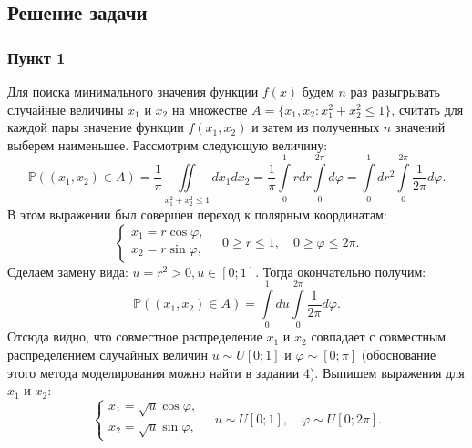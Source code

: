 \documentclass[oneside, final, 12pt]{article}
\begin{document}
\subsection{Решение задачи}
\subsubsection{Пункт 1}
	Для поиска минимального значения функции $f(x)$ будем $n$ раз разыгрывать случайные величины 
	$x_1$ и $x_2$ на множестве  $A = \{x_1, x_2: x_1^2+x_2^2\leqslant 1\}$, считать для каждой пары
	 значение функции $f(x_1, x_2)$ и затем из полученных $n$ значений выберем наименьшее.
	 \newline
	Рассмотрим следующую величину:
	$$
		\mathbb{P}((x_1,x_2) \in A) = \frac{1}{\pi} \iint\limits_{x_1^2+x_2^2\leqslant 1} dx_1dx_2 =  
														\frac{1}{\pi}\int\limits_0^1rdr\int\limits_0^{2\pi}d\varphi = 
														\int\limits_0^1dr^2\int\limits_0^{2\pi}\frac{1}{2\pi}d\varphi.
	$$
	В этом выражении был совершен переход к полярным координатам: 
	$$
		\begin{cases}
			x_1 = r \cos \varphi,\\
			x_2 = r \sin \varphi,
		\end{cases} 
		\quad  0 \geqslant r \leqslant 1, \quad  0 \geqslant \varphi \leqslant 2\pi.
	$$ 
	Сделаем замену вида: $u = r^2>0, u \in [0;1]$.
	Тогда окончательно получим:
	$$
		\mathbb{P}((x_1,x_2) \in A) = \int\limits_0^1du\int\limits_0^{2\pi}\frac{1}{2\pi}d\varphi.
	$$
	Отсюда видно, что совместное распределение $x_1$ и $x_2$ совпадает с совместным распределением
	случайных величин $u\sim U[0;1]$ и $\varphi\sim[0;\pi]$ (обоснование этого метода моделирования
	можно найти в задании 4). Выпишем выражения для $x_1$ и $x_2$:
	$$
		\begin{cases}
			x_1 = \sqrt{u}\cos \varphi, \\
			x_2 = \sqrt{u}\sin \varphi, 
		\end{cases}
		\quad u\sim U[0;1], 
		\quad \varphi \sim U[0;2\pi].
	$$	
	
\end{document}
